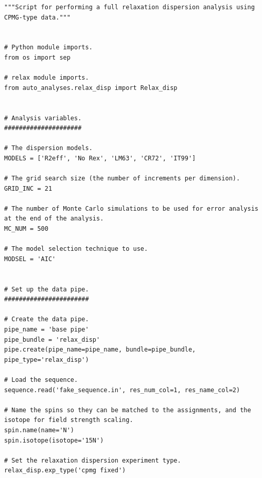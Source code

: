 \begin{lstlisting}
"""Script for performing a full relaxation dispersion analysis using CPMG-type data."""


# Python module imports.
from os import sep

# relax module imports.
from auto_analyses.relax_disp import Relax_disp


# Analysis variables.
#####################

# The dispersion models.
MODELS = ['R2eff', 'No Rex', 'LM63', 'CR72', 'IT99']

# The grid search size (the number of increments per dimension).
GRID_INC = 21

# The number of Monte Carlo simulations to be used for error analysis at the end of the analysis.
MC_NUM = 500

# The model selection technique to use.
MODSEL = 'AIC'


# Set up the data pipe.
#######################

# Create the data pipe.
pipe_name = 'base pipe'
pipe_bundle = 'relax_disp'
pipe.create(pipe_name=pipe_name, bundle=pipe_bundle, pipe_type='relax_disp')

# Load the sequence.
sequence.read('fake_sequence.in', res_num_col=1, res_name_col=2)

# Name the spins so they can be matched to the assignments, and the isotope for field strength scaling.
spin.name(name='N')
spin.isotope(isotope='15N')

# Set the relaxation dispersion experiment type.
relax_disp.exp_type('cpmg fixed')


\end{lstlisting}
